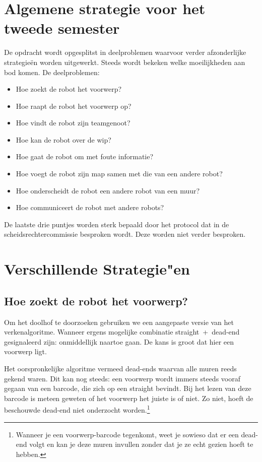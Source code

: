 \documentclass{peno}
\begin{document}
\maketitle

\section*{Algemene strategie voor het tweede semester}

De opdracht wordt opgesplitst in deelproblemen waarvoor verder afzonderlijke strategie\"en worden uitgewerkt. Steeds wordt bekeken welke moeilijkheden aan bod komen. De deelproblemen:
\begin{itemize}
\item Hoe zoekt de robot het voorwerp?
\item Hoe raapt de robot het voorwerp op?
\item Hoe vindt de robot zijn teamgenoot?
\item Hoe kan de robot over de wip?
\item Hoe gaat de robot om met foute informatie?
\item Hoe voegt de robot zijn map samen met die van een andere robot?
\item Hoe onderscheidt de robot een andere robot van een muur?
\item Hoe communiceert de robot met andere robots?
\end{itemize}

De laatste drie puntjes worden sterk bepaald door het protocol dat in de scheidsrechtercommissie besproken wordt. Deze worden niet verder besproken.


\section*{Verschillende Strategie"en}
\subsection*{Hoe zoekt de robot het voorwerp?}

Om het doolhof te doorzoeken gebruiken we een aangepaste versie van het verkenalgoritme. Wanneer ergens mogelijke combinatie straight~+~dead-end gesignaleerd zijn: onmiddellijk naartoe gaan. De kans is groot dat hier een voorwerp ligt.

Het oorspronkelijke algoritme vermeed dead-ends waarvan alle muren reeds gekend waren. Dit kan nog steeds: een voorwerp wordt immers steeds vooraf gegaan van een barcode, die zich op een straight bevindt. Bij het lezen van deze barcode is meteen geweten of het voorwerp het juiste is of niet. Zo niet, hoeft de beschouwde dead-end niet onderzocht worden.\footnote{Wanneer je een voorwerp-barcode tegenkomt, weet je sowieso dat er een dead-end volgt en kan je deze muren invullen zonder dat je ze echt gezien hoeft te hebben.}
\end{document}
